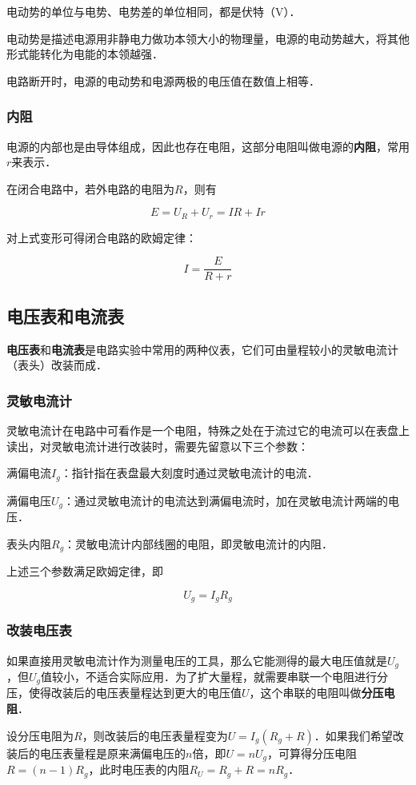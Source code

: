 电动势的单位与电势、电势差的单位相同，都是伏特（$\mathrm{V}$）．

电动势是描述电源用非静电力做功本领大小的物理量，电源的电动势越大，将其他形式能转化为电能的本领越强．

电路断开时，电源的电动势和电源两极的电压值在数值上相等．

\subsubsection{内阻}

电源的内部也是由导体组成，因此也存在电阻，这部分电阻叫做电源的\textbf{内阻}，常用$r$来表示．

在闭合电路中，若外电路的电阻为$R$，则有

\begin{equation}
E=U_R+U_r=IR+Ir
\end{equation}

对上式变形可得闭合电路的欧姆定律：

\begin{equation}
I=\frac{E}{R+r}
\end{equation}

\subsection{电压表和电流表}


\textbf{电压表}和\textbf{电流表}是电路实验中常用的两种仪表，它们可由量程较小的灵敏电流计（表头）改装而成．

\subsubsection{灵敏电流计}

灵敏电流计在电路中可看作是一个电阻，特殊之处在于流过它的电流可以在表盘上读出，对灵敏电流计进行改装时，需要先留意以下三个参数：

满偏电流$I_g$：指针指在表盘最大刻度时通过灵敏电流计的电流．

满偏电压$U_g$：通过灵敏电流计的电流达到满偏电流时，加在灵敏电流计两端的电压．

表头内阻$R_g$：灵敏电流计内部线圈的电阻，即灵敏电流计的内阻．

上述三个参数满足欧姆定律，即

\begin{equation}
U_g=I_g R_g
\end{equation}

\subsubsection{改装电压表}

如果直接用灵敏电流计作为测量电压的工具，那么它能测得的最大电压值就是$U_g$，但$U_g$值较小，不适合实际应用．为了扩大量程，就需要串联一个电阻进行分压，使得改装后的电压表量程达到更大的电压值$U$，这个串联的电阻叫做\textbf{分压电阻}．

设分压电阻为$R$，则改装后的电压表量程变为$U=I_g(R_g+R)$．如果我们希望改装后的电压表量程是原来满偏电压的$n$倍，即$U=nU_g$，可算得分压电阻$R=(n-1)R_g$，此时电压表的内阻$R_U=R_g+R=nR_g$．
